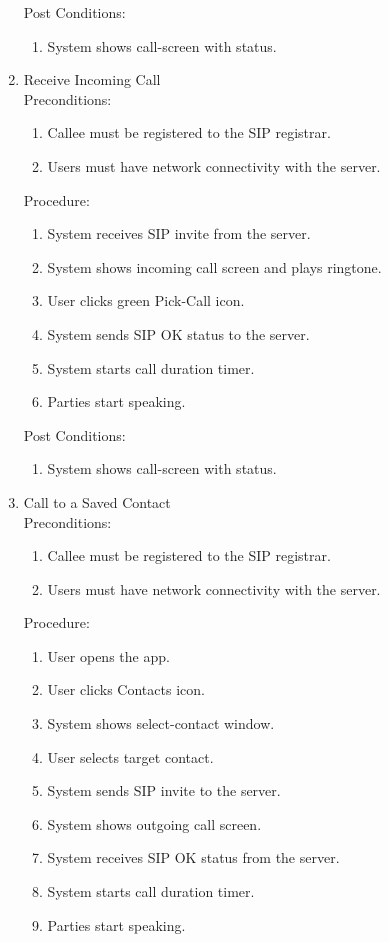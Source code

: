 \begin{enumerate}
 Post Conditions:
 \begin{enumerate}
  \item System shows call-screen with status.
 \end{enumerate}


 \item Receive Incoming Call
 \\ Preconditions:
 \begin{enumerate}
  \item Callee must be registered to the SIP registrar.
  \item Users must have network connectivity with the server.
 \end{enumerate}

 Procedure:
 \begin{enumerate}
  \item System receives SIP invite from the server.
  \item System shows incoming call screen and plays ringtone.
  \item User clicks green Pick-Call icon.
  \item System sends SIP OK status to the server.
  \item System starts call duration timer.
  \item Parties start speaking.
 \end{enumerate}

 Post Conditions:
 \begin{enumerate}
  \item System shows call-screen with status.
 \end{enumerate}


 \item Call to a Saved Contact
 \\ Preconditions:
 \begin{enumerate}
  \item Callee must be registered to the SIP registrar.
  \item Users must have network connectivity with the server.
 \end{enumerate}

 Procedure:
 \begin{enumerate}
  \item User opens the app.
  \item User clicks Contacts icon.
  \item System shows select-contact window.
  \item User selects target contact.
  \item System sends SIP invite to the server.
  \item System shows outgoing call screen.
  \item System receives SIP OK status from the server.
  \item System starts call duration timer.
  \item Parties start speaking.
 \end{enumerate}


\end{enumerate}
